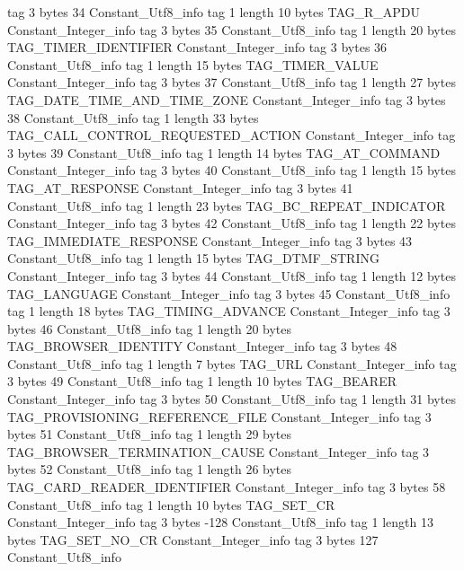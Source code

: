 {{{			tag	3
			bytes	34
		}
		Constant_Utf8_info {
			tag	1
			length	10
			bytes	TAG_R_APDU
		}
		Constant_Integer_info {
			tag	3
			bytes	35
		}
		Constant_Utf8_info {
			tag	1
			length	20
			bytes	TAG_TIMER_IDENTIFIER
		}
		Constant_Integer_info {
			tag	3
			bytes	36
		}
		Constant_Utf8_info {
			tag	1
			length	15
			bytes	TAG_TIMER_VALUE
		}
		Constant_Integer_info {
			tag	3
			bytes	37
		}
		Constant_Utf8_info {
			tag	1
			length	27
			bytes	TAG_DATE_TIME_AND_TIME_ZONE
		}
		Constant_Integer_info {
			tag	3
			bytes	38
		}
		Constant_Utf8_info {
			tag	1
			length	33
			bytes	TAG_CALL_CONTROL_REQUESTED_ACTION
		}
		Constant_Integer_info {
			tag	3
			bytes	39
		}
		Constant_Utf8_info {
			tag	1
			length	14
			bytes	TAG_AT_COMMAND
		}
		Constant_Integer_info {
			tag	3
			bytes	40
		}
		Constant_Utf8_info {
			tag	1
			length	15
			bytes	TAG_AT_RESPONSE
		}
		Constant_Integer_info {
			tag	3
			bytes	41
		}
		Constant_Utf8_info {
			tag	1
			length	23
			bytes	TAG_BC_REPEAT_INDICATOR
		}
		Constant_Integer_info {
			tag	3
			bytes	42
		}
		Constant_Utf8_info {
			tag	1
			length	22
			bytes	TAG_IMMEDIATE_RESPONSE
		}
		Constant_Integer_info {
			tag	3
			bytes	43
		}
		Constant_Utf8_info {
			tag	1
			length	15
			bytes	TAG_DTMF_STRING
		}
		Constant_Integer_info {
			tag	3
			bytes	44
		}
		Constant_Utf8_info {
			tag	1
			length	12
			bytes	TAG_LANGUAGE
		}
		Constant_Integer_info {
			tag	3
			bytes	45
		}
		Constant_Utf8_info {
			tag	1
			length	18
			bytes	TAG_TIMING_ADVANCE
		}
		Constant_Integer_info {
			tag	3
			bytes	46
		}
		Constant_Utf8_info {
			tag	1
			length	20
			bytes	TAG_BROWSER_IDENTITY
		}
		Constant_Integer_info {
			tag	3
			bytes	48
		}
		Constant_Utf8_info {
			tag	1
			length	7
			bytes	TAG_URL
		}
		Constant_Integer_info {
			tag	3
			bytes	49
		}
		Constant_Utf8_info {
			tag	1
			length	10
			bytes	TAG_BEARER
		}
		Constant_Integer_info {
			tag	3
			bytes	50
		}
		Constant_Utf8_info {
			tag	1
			length	31
			bytes	TAG_PROVISIONING_REFERENCE_FILE
		}
		Constant_Integer_info {
			tag	3
			bytes	51
		}
		Constant_Utf8_info {
			tag	1
			length	29
			bytes	TAG_BROWSER_TERMINATION_CAUSE
		}
		Constant_Integer_info {
			tag	3
			bytes	52
		}
		Constant_Utf8_info {
			tag	1
			length	26
			bytes	TAG_CARD_READER_IDENTIFIER
		}
		Constant_Integer_info {
			tag	3
			bytes	58
		}
		Constant_Utf8_info {
			tag	1
			length	10
			bytes	TAG_SET_CR
		}
		Constant_Integer_info {
			tag	3
			bytes	-128
		}
		Constant_Utf8_info {
			tag	1
			length	13
			bytes	TAG_SET_NO_CR
		}
		Constant_Integer_info {
			tag	3
			bytes	127
		}
		Constant_Utf8_info {
}}}
